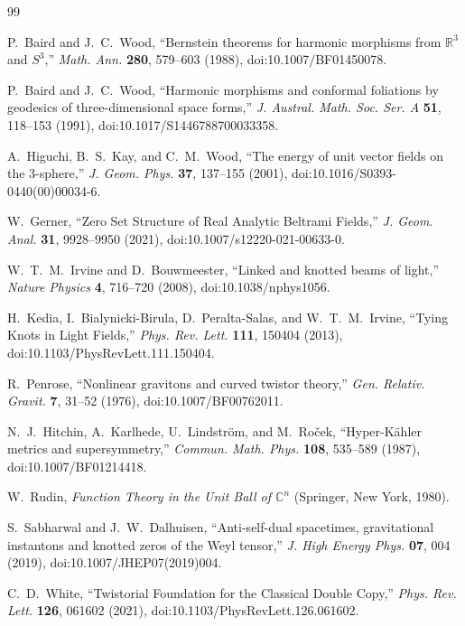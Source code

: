 \documentclass[aps,prd,reprint,nofootinbib,superscriptaddress]{revtex4-2}
\theoremstyle{definition}
\theoremstyle{remark}
\newcommand{\R}{\mathbb{R}}
\begin{document}
\begin{thebibliography}{99}

P.~Baird and J.~C.~Wood,
``Bernstein theorems for harmonic morphisms from $\R^3$ and $S^3$,''
\emph{Math. Ann.} \textbf{280}, 579--603 (1988),
 doi:10.1007/BF01450078.

P.~Baird and J.~C.~Wood,
``Harmonic morphisms and conformal foliations by geodesics of three-dimensional space forms,''
\emph{J. Austral. Math. Soc. Ser. A} \textbf{51}, 118--153 (1991),
doi:10.1017/S1446788700033358.

A.~Higuchi, B.~S.~Kay, and C.~M.~Wood,
``The energy of unit vector fields on the 3-sphere,''
\emph{J. Geom. Phys.} \textbf{37}, 137--155 (2001),
doi:10.1016/S0393-0440(00)00034-6.

W.~Gerner,
``Zero Set Structure of Real Analytic Beltrami Fields,''
\emph{J. Geom. Anal.} \textbf{31}, 9928--9950 (2021),
doi:10.1007/s12220-021-00633-0.

W.~T.~M.~Irvine and D.~Bouwmeester,
``Linked and knotted beams of light,''
\emph{Nature Physics} \textbf{4}, 716--720 (2008),
doi:10.1038/nphys1056.

H.~Kedia, I.~Bialynicki-Birula, D.~Peralta-Salas, and W.~T.~M.~Irvine,
``Tying Knots in Light Fields,''
\emph{Phys. Rev. Lett.} \textbf{111}, 150404 (2013),
doi:10.1103/PhysRevLett.111.150404.


R.~Penrose,
``Nonlinear gravitons and curved twistor theory,''
\emph{Gen. Relativ. Gravit.} \textbf{7}, 31--52 (1976),
doi:10.1007/BF00762011.

N.~J.~Hitchin, A.~Karlhede, U.~Lindstr\"om, and M.~Ro\v{c}ek,
``Hyper-K\"ahler metrics and supersymmetry,''
\emph{Commun. Math. Phys.} \textbf{108}, 535--589 (1987),
doi:10.1007/BF01214418.

W.~Rudin,
\emph{Function Theory in the Unit Ball of $\mathbb C^n$}
(Springer, New York, 1980).



S.~Sabharwal and J.~W.~Dalhuisen,
``Anti-self-dual spacetimes, gravitational instantons and knotted zeros of the Weyl tensor,''
\emph{J. High Energy Phys.} \textbf{07}, 004 (2019),
doi:10.1007/JHEP07(2019)004.

C.~D.~White,
``Twistorial Foundation for the Classical Double Copy,''
\emph{Phys. Rev. Lett.} \textbf{126}, 061602 (2021),
doi:10.1103/PhysRevLett.126.061602.


\end{thebibliography}
\end{document}
